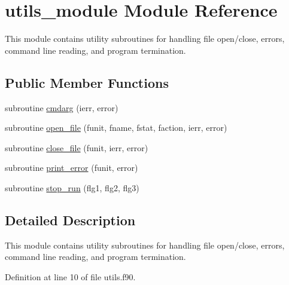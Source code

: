 \hypertarget{classutils__module}{\section{utils\-\_\-module Module Reference}
\label{classutils__module}
}


This module contains utility subroutines for handling file open/close, errors, command line reading, and program termination.  


\subsection*{Public Member Functions}
\begin{DoxyCompactItemize}
\item 
subroutine \hyperlink{classutils__module_a797d1ed5b401270103a835be4858d154}{cmdarg} (ierr, error)
\item 
subroutine \hyperlink{classutils__module_af8ffeec2920a1ea094d0a8a4a35c0682}{open\-\_\-file} (funit, fname, fstat, faction, ierr, error)
\item 
subroutine \hyperlink{classutils__module_af9dcae3bb118ed1ef50344a65d0900a3}{close\-\_\-file} (funit, ierr, error)
\item 
subroutine \hyperlink{classutils__module_a8e88a08183e1a44d33383ee401e65dbb}{print\-\_\-error} (funit, error)
\item 
subroutine \hyperlink{classutils__module_a0566fadf7a2baadac1db54851c3045d9}{stop\-\_\-run} (flg1, flg2, flg3)
\end{DoxyCompactItemize}


\subsection{Detailed Description}
This module contains utility subroutines for handling file open/close, errors, command line reading, and program termination. 

Definition at line 10 of file utils.\-f90.



